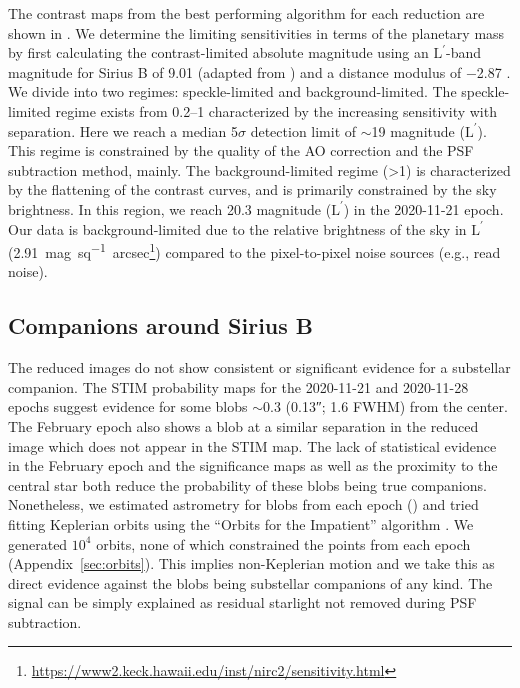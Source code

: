 \documentclass[twocolumn]{aastex631}
\newcommand\Lp{$\mathrm{L}^\prime$}
\begin{document}
The contrast maps from the best performing algorithm for each reduction are shown in . We determine the limiting sensitivities in terms of the planetary mass by first calculating the contrast-limited absolute magnitude using an \Lp-band magnitude for Sirius B of 9.01 (adapted from \citealp{bonnet-bidaudADONISHighContrast2008a}) and a distance modulus of \num{-2.87} \citep{collaborationGaiaEarlyData2021a}. We divide  into two regimes: speckle-limited and background-limited. The speckle-limited regime exists from \qtyrange{0.2}{1}{\au} characterized by the increasing sensitivity with separation. Here we reach a median 5$\sigma$ detection limit of $\sim$19 magnitude (\Lp). This regime is constrained by the quality of the AO correction and the PSF subtraction method, mainly. The background-limited regime (\textgreater\qty{1}{\au}) is characterized by the flattening of the contrast curves, and is primarily constrained by the sky brightness. In this region, we reach 20.3 magnitude (\Lp) in the 2020-11-21 epoch. Our data is background-limited due to the relative brightness of the sky in \Lp (\qty{2.91}{mag\per sq. arcsec}\footnote{\url{https://www2.keck.hawaii.edu/inst/nirc2/sensitivity.html}}) compared to the pixel-to-pixel noise sources (e.g., read noise).

\subsection{Companions around Sirius B}

The reduced images do not show consistent or significant evidence for a substellar companion. The STIM probability maps for the 2020-11-21 and 2020-11-28 epochs suggest evidence for some blobs $\sim$\qty{0.3}{\au} (\ang{;;0.13}; 1.6 FWHM) from the center. The February epoch also shows a blob at a similar separation in the reduced image which does not appear in the STIM map. The lack of statistical evidence in the February epoch and the significance maps as well as the proximity to the central star both reduce the probability of these blobs being true companions. Nonetheless, we estimated astrometry for blobs from each epoch () and tried fitting Keplerian orbits using the ``Orbits for the Impatient'' algorithm \citep[OFTI;][]{bluntOrbitsImpatientBayesian2017a}. We generated $10^4$ orbits, none of which constrained the points from each epoch (Appendix~\ref{sec:orbits}). This implies non-Keplerian motion and we take this as direct evidence against the blobs being substellar companions of any kind. The signal can be simply explained as residual starlight not removed during PSF subtraction.
\end{document}
